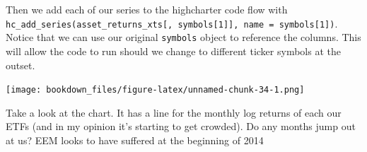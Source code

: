 \documentclass[]{krantz}
\makeatletter
\newenvironment{Shaded}{\begin{snugshade}}{\end{snugshade}}
\newcommand{\KeywordTok}[1]{\textcolor[rgb]{0.13,0.29,0.53}{\textbf{#1}}}
\newcommand{\DataTypeTok}[1]{\textcolor[rgb]{0.13,0.29,0.53}{#1}}
\newcommand{\DecValTok}[1]{\textcolor[rgb]{0.00,0.00,0.81}{#1}}
\newcommand{\StringTok}[1]{\textcolor[rgb]{0.31,0.60,0.02}{#1}}
\newcommand{\OtherTok}[1]{\textcolor[rgb]{0.56,0.35,0.01}{#1}}
\newcommand{\OperatorTok}[1]{\textcolor[rgb]{0.81,0.36,0.00}{\textbf{#1}}}
\newcommand{\NormalTok}[1]{#1}
\newenvironment{kframe}{%
\medskip{}
\setlength{\fboxsep}{.8em}
 \def\at@end@of@kframe{}%
 \ifinner\ifhmode%
  \def\at@end@of@kframe{\end{minipage}}%
  \begin{minipage}{\columnwidth}%
 \fi\fi%
 \def\FrameCommand##1{\hskip\@totalleftmargin \hskip-\fboxsep
 \colorbox{shadecolor}{##1}\hskip-\fboxsep
     \hskip-\linewidth \hskip-\@totalleftmargin \hskip\columnwidth}%
 \MakeFramed {\advance\hsize-\width
   \@totalleftmargin\z@ \linewidth\hsize
   \@setminipage}}%
 {\par\unskip\endMakeFramed%
 \at@end@of@kframe}
\renewenvironment{Shaded}{\begin{kframe}}{\end{kframe}}
\makeatother
\begin{document}
Then we add each of our series to the highcharter code flow with
\texttt{hc\_add\_series(asset\_returns\_xts{[},\ symbols{[}1{]}{]},\ name\ =\ symbols{[}1{]})}.
Notice that we can use our original \texttt{symbols} object to reference
the columns. This will allow the code to run should we change to
different ticker symbols at the outset.

\begin{Shaded}
\end{Shaded}

\texttt{[image: bookdown\_files/figure-latex/unnamed-chunk-34-1.png]}

Take a look at the chart. It has a line for the monthly log returns of
each our ETFs (and in my opinion it's starting to get crowded). Do any
months jump out at us? EEM looks to have suffered at the beginning of
2014
\end{document}
